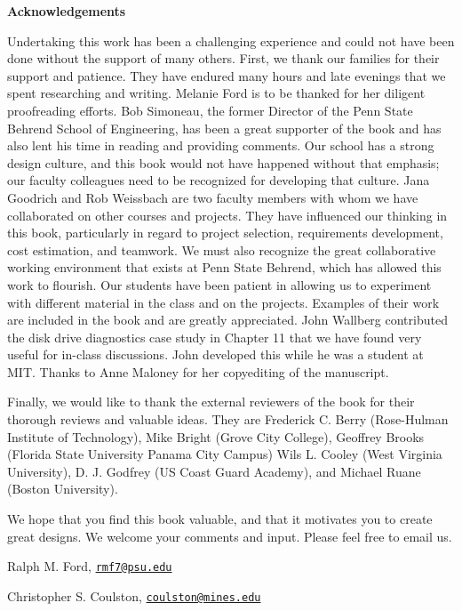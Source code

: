 \textbf{Acknowledgements}

Undertaking this work has been a challenging experience and could not
have been done without the support of many others. First, we thank our
families for their support and patience. They have endured many hours
and late evenings that we spent researching and writing. Melanie Ford is
to be thanked for her diligent proofreading efforts. Bob Simoneau, the
former Director of the Penn State Behrend School of Engineering, has
been a great supporter of the book and has also lent his time in reading
and providing comments. Our school has a strong design culture, and this
book would not have happened without that emphasis; our faculty
colleagues need to be recognized for developing that culture. Jana
Goodrich and Rob Weissbach are two faculty members with whom we have
collaborated on other courses and projects. They have influenced our
thinking in this book, particularly in regard to project selection,
requirements development, cost estimation, and teamwork. We must also
recognize the great collaborative working environment that exists at
Penn State Behrend, which has allowed this work to flourish. Our
students have been patient in allowing us to experiment with different
material in the class and on the projects. Examples of their work are
included in the book and are greatly appreciated. John Wallberg
contributed the disk drive diagnostics case study in Chapter 11 that we
have found very useful for in-class discussions. John developed this
while he was a student at MIT. Thanks to Anne Maloney for her
copyediting of the manuscript. 

Finally, we would like to thank the external reviewers of the book for
their thorough reviews and valuable ideas. They are Frederick C. Berry
(Rose-Hulman Institute of Technology), Mike Bright (Grove City College),
Geoffrey Brooks (Florida State University Panama City Campus) Wils L.
Cooley (West Virginia University), D. J. Godfrey (US Coast Guard
Academy), and Michael Ruane (Boston University).

We hope that you find this book valuable, and that it motivates you to
create great designs. We welcome your comments and input. Please feel
free to email us.

Ralph M. Ford, \href{mailto:rmf7@psu.edu}{\nolinkurl{rmf7@psu.edu}}

Christopher S. Coulston,
 \href{mailto:coulston@mines.edu}{\nolinkurl{coulston@mines.edu}}
